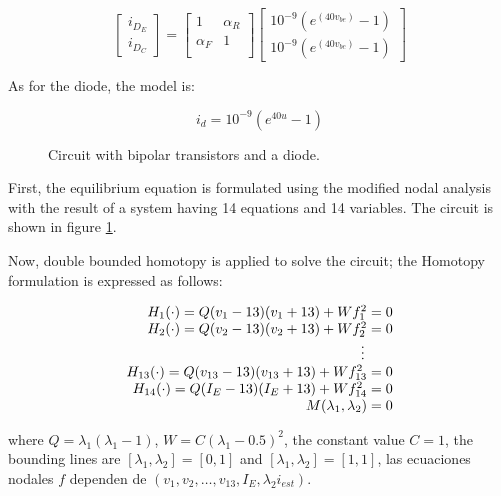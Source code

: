 \documentclass[conference,letterpaper,twocolumn]{IEEEtran}
\begin{document}
\begin{displaymath}
\left[ \begin{array}{c}
i_{D_E} \\
i_{D_C}
\end{array}\right] =
\left[ \begin{array}{cc} 1  & \alpha_R \\
\alpha_F & 1 \\
\end{array}\right] \left[ \begin{array}{c}
10^{-9}(e^{(40v_{be})} - 1) \\
10^{-9}(e^{(40v_{bc})} - 1)
\end{array}\right]
\end{displaymath}

As for the diode, the model is:

\begin{displaymath}
i_d=10^{-9}(e^{40u} - 1)
\end{displaymath}

\begin{figure}[hbtp]
\centerline{
\epsfxsize=75mm
}
\caption{Circuit with bipolar transistors and a diode.}
\label{yamamuracircuito}
\end{figure}

First, the equilibrium equation is formulated using the modified nodal analysis with the result of a system having 14 equations and 14 variables. The circuit is shown in figure \ref{yamamuracircuito}.


Now, double bounded homotopy is applied to solve the circuit; the Homotopy formulation is expressed as follows:


\begin{displaymath}
{\small
\begin{array}{r}
H_1(\cdot)=Q(v_1-13)(v_1+13)+ W f_1^2=0\\
H_2(\cdot)=Q(v_2-13)(v_2+13)+ W f_2^2=0\\
\vdots \qquad \\
H_{13}(\cdot)=Q(v_{13}-13)(v_{13}+13)+ W f_{13}^2=0\\
H_{14}(\cdot)=Q(I_E-13)(I_E+13)+ W f_{14}^2=0\\
M(\lambda_1,\lambda_2)=0
\end{array}}
\end{displaymath}


where $Q=\lambda_1(\lambda_1-1)$, $W=C(\lambda_1-0.5)^2 $, the constant value $C=1$, the bounding lines are $[\lambda_1,\lambda_2]=[0,1]$ and $[\lambda_1,\lambda_2]=[1,1]$, las ecuaciones nodales $f$ dependen de $(v_1,v_2,\hdots,v_{13},I_E,\lambda_2i_{est})$.
\end{document}
